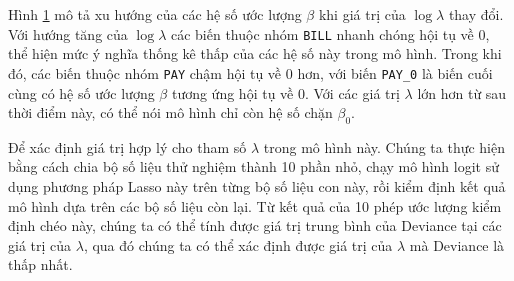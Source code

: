 \begin{figure}[h]
\centering
\capstart
\begin{knitrout}
\color{fgcolor}
\end{knitrout}
\caption{}
\label{fig:lasso_coef}
\end{figure}

Hình \ref{fig:lasso_coef} mô tả xu hướng của các hệ số ước lượng $\beta$ khi giá trị của $\log\lambda$ thay đổi.
Với hướng tăng của $\log\lambda$ các biến thuộc nhóm \texttt{BILL} nhanh chóng hội tụ về $0$, thể hiện mức ý nghĩa thống kê thấp của các hệ số này trong mô hình. Trong khi đó, các biến thuộc nhóm \texttt{PAY} chậm hội tụ về $0$ hơn, với biến \texttt{PAY\_0} là biến cuối cùng có hệ số ước lượng $\beta$ tương ứng hội tụ về 0.
Với các giá trị $\lambda$ lớn hơn từ sau thời điểm này, có thể nói mô hình chỉ còn hệ số chặn $\beta_0$.

Để xác định giá trị hợp lý cho tham số $\lambda$ trong mô hình này. Chúng ta thực hiện bằng cách chia bộ số liệu thử nghiệm thành 10 phần nhỏ, chạy mô hình logit sử dụng phương pháp Lasso này trên từng bộ số liệu con này, rồi kiểm định kết quả mô hình dựa trên các bộ số liệu còn lại.
Từ kết quả của 10 phép ước lượng kiểm định chéo này, chúng ta có thể tính được giá trị trung bình của Deviance tại các giá trị của $\lambda$, qua đó chúng ta có thể xác định được giá trị của $\lambda$ mà Deviance là thấp nhất.

